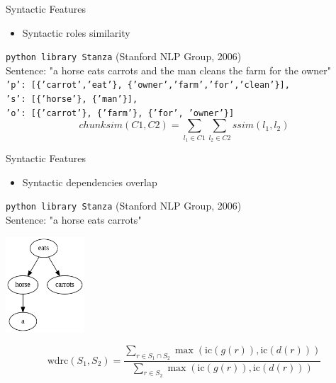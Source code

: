 \begin{frame}{Syntactic Features}
    \begin{itemize}
        \item Syntactic roles similarity 
    \end{itemize}
    \vspace{0.3cm}
    \texttt{python library Stanza} (Stanford NLP Group, 2006)\\ \vspace{0.1cm}
    Sentence: "a horse eats carrots and the man cleans the farm for the owner" \\ \vspace{0.1cm}
    \texttt{'p': [\{'carrot','eat'\}, \{'owner','farm','for','clean'\}],
    \\ 's': [\{'horse'\}, \{'man'\}], 
    \\ 'o': [\{'carrot'\}, \{'farm'\}, \{'for', 'owner'\}]}
         \[ chunksim(C1, C2) = \sum_{ l_1 \in C1} \sum_{l_2 \in C2}  ssim(l_1, l_2) \]
\end{frame}

\begin{frame}{Syntactic Features}
    \begin{itemize}
        \item Syntactic dependencies overlap
    \end{itemize}
    \vspace{0.2cm}
    \texttt{python library Stanza} (Stanford NLP Group, 2006) \\
    Sentence: "a horse eats carrots" \\
    \begin{center}
        \includegraphics[width=0.22\textwidth]{figures/dependency_tree.png}
    \end{center}
        \[ \text{wdrc}(S_1, S_2) = \frac{\sum_{r \in S_1 \cap S_2} \max(\text{ic}(g(r)), \text{ic}(d(r)))}{\sum_{r \in S_2} 
\max(\text{ic}(g(r)), \text{ic}(d(r)))} \]
\end{frame}


